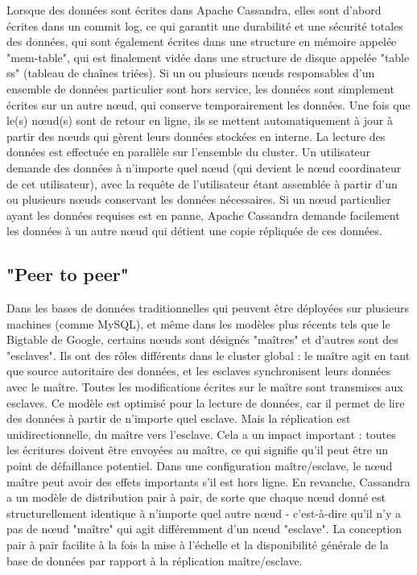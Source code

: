 \documentclass[12pt, letterpaper]{report}
\begin{document}
Lorsque des données sont écrites dans Apache Cassandra, elles sont d'abord écrites dans un commit log, ce qui garantit une durabilité et une sécurité totales des données, qui sont également écrites dans une structure en mémoire appelée "mem-table", qui est finalement vidée dans une structure de disque appelée "table ss" (tableau de chaînes triées).
\newline
Si un ou plusieurs nœuds responsables d'un ensemble de données particulier sont hors service, les données sont simplement écrites sur un autre nœud, qui conserve temporairement les données. Une fois que le(s) nœud(s) sont de retour en ligne, ils se mettent automatiquement à jour à partir des nœuds qui gèrent leurs données stockées en interne. La lecture des données est effectuée en parallèle sur l'ensemble du cluster. Un utilisateur demande des données à n'importe quel nœud (qui devient le nœud coordinateur de cet utilisateur), avec la requête de l'utilisateur étant assemblée à partir d'un ou plusieurs nœuds conservant les données nécessaires. Si un nœud particulier ayant les données requises est en panne, Apache Cassandra demande facilement les données à un autre nœud qui détient une copie répliquée de ces données.

\subsection{"Peer to peer"}
Dans les bases de données traditionnelles qui peuvent être déployées sur plusieurs machines (comme MySQL), et même dans les modèles plus récents tels que le Bigtable de Google, certains nœuds sont désignés "maîtres" et d’autres sont des "esclaves". Ils ont des rôles différents dans le cluster global : le maître agit en tant que source autoritaire des données, et les esclaves synchronisent leurs données avec le maître. Toutes les modifications écrites sur le maître sont transmises aux esclaves. Ce modèle est optimisé pour la lecture de données, car il permet de lire des données à partir de n'importe quel esclave. Mais la réplication est unidirectionnelle, du maître vers l'esclave. Cela a un impact important : toutes les écritures doivent être envoyées au maître, ce qui signifie qu'il peut être un point de défaillance potentiel. Dans une configuration maître/esclave, le nœud maître peut avoir des effets importants s'il est hors ligne.
\newline
En revanche, Cassandra a un modèle de distribution pair à pair, de sorte que chaque nœud donné est structurellement identique à n'importe quel autre nœud - c'est-à-dire qu'il n'y a pas de nœud "maître" qui agit différemment d'un nœud "esclave".
\newline
La conception pair à pair facilite à la fois la mise à l'échelle et la disponibilité générale de la base de données par rapport à la réplication maître/esclave.
\end{document}
